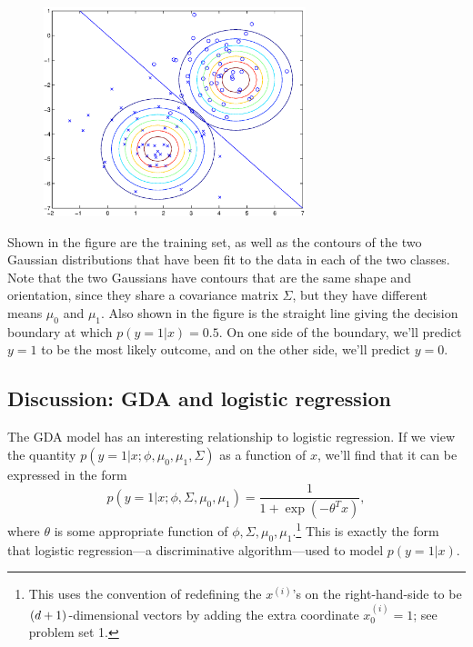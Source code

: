 \documentclass{article}
\begin{document}
\begin{figure}[H]
\begin{center}
	\includegraphics[width=3in]{disgen3c.eps}
\end{center}
\end{figure}

%

Shown in the figure are the training set, as well as the contours of the
two Gaussian distributions that have been fit to the data in each of the
two classes.  Note that the two Gaussians have contours that are the same
shape and orientation, since they share a covariance matrix $\Sigma$, but
they have different means $\mu_0$ and $\mu_1$.  Also shown in the figure is
the straight line giving the decision boundary at which $p(y=1|x) = 0.5$.  On
one side of the boundary, we'll predict $y=1$ to be the most likely outcome, and
on the other side, we'll predict $y=0$.

\subsection{Discussion: GDA and logistic regression}

The GDA model has an interesting relationship to logistic regression.  If we view
the quantity $p(y=1|x;\phi, \mu_0, \mu_1, \Sigma)$ as a function of $x$, we'll
find that it can be expressed in the form
\[
p(y =1| x ; \phi, \Sigma, \mu_0, \mu_1) = \frac{1}{1+\exp(-\theta^Tx)},
\]
where $\theta$ is some appropriate function of $\phi, \Sigma, \mu_0, \mu_1$.\footnote{
This uses the convention of redefining the $x^{(i)}$'s on the right-hand-side to be
$({d}+1)$-dimensional vectors by adding the extra coordinate $x^{(i)}_0 = 1$; see
problem set 1.}  This is exactly the form that logistic regression---a discriminative algorithm---used to
model $p(y=1|x)$.
\end{document}
